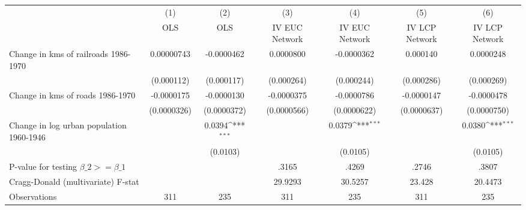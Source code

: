 {
\def\sym#1{\ifmmode^{#1}\else\(^{#1}\)\fi}
\begin{tabular}{l*{6}{c}}
\hline\hline
                &\multicolumn{1}{c}{(1)}&\multicolumn{1}{c}{(2)}&\multicolumn{1}{c}{(3)}&\multicolumn{1}{c}{(4)}&\multicolumn{1}{c}{(5)}&\multicolumn{1}{c}{(6)}\\
                &\multicolumn{1}{c}{OLS}&\multicolumn{1}{c}{OLS}&\multicolumn{1}{c}{IV EUC Network}&\multicolumn{1}{c}{IV EUC Network}&\multicolumn{1}{c}{IV LCP Network}&\multicolumn{1}{c}{IV LCP Network}\\
\hline
Change in kms of railroads 1986-1970&0.00000743         &-0.0000462         &0.0000800         &-0.0000362         & 0.000140         &0.0000248         \\
                &(0.000112)         &(0.000117)         &(0.000264)         &(0.000244)         &(0.000286)         &(0.000269)         \\
[1em]
Change in kms of roads 1986-1970&-0.0000175         &-0.0000130         &-0.0000375         &-0.0000786         &-0.0000147         &-0.0000478         \\
                &(0.0000326)         &(0.0000372)         &(0.0000566)         &(0.0000622)         &(0.0000637)         &(0.0000750)         \\
[1em]
Change in log urban population 1960-1946&                  &   0.0394\sym{***}&                  &   0.0379\sym{***}&                  &   0.0380\sym{***}\\
                &                  & (0.0103)         &                  & (0.0105)         &                  & (0.0105)         \\
\hline
P-value for testing $\beta\_{2} >= \beta\_{1}$&                  &                  &    .3165         &    .4269         &    .2746         &    .3807         \\
Cragg-Donald (multivariate) F-stat&                  &                  &  29.9293         &  30.5257         &   23.428         &  20.4473         \\
Observations    &      311         &      235         &      311         &      235         &      311         &      235         \\
\hline\hline
\end{tabular}
}
